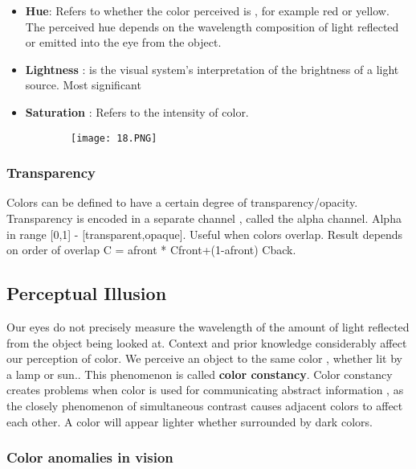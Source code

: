 \documentclass{article}
\begin{document}
\begin{itemize}
    \item \textbf{Hue}: Refers to whether the color perceived is , for example red or yellow. The perceived hue depends on the wavelength composition of light reflected or emitted into the eye from the object.
    \item \textbf{Lightness} : is the visual system's interpretation  of the brightness of a light source. Most significant
    \item \textbf{Saturation} : Refers to the intensity of color. 
\end{itemize}

\begin{figure}[ht!]
  \centering
  \begin{subfigure}[b]{0.3\linewidth}
    \texttt{[image: 18.PNG]}
  \end{subfigure}
\end{figure}

\subsubsection{Transparency}

Colors can be defined to have a certain degree of transparency/opacity.
Transparency is encoded in a separate channel , called the alpha channel. Alpha in range [0,1] - [transparent,opaque].
Useful when colors overlap. Result depends on order of overlap C = afront * Cfront+(1-afront) Cback.

\subsection{Perceptual Illusion}

Our eyes do not precisely measure the wavelength of the amount of light reflected from the object being looked at. Context and prior knowledge considerably affect our perception of color.
We perceive an object to the same color , whether lit by a lamp or sun..
This phenomenon is called \textbf{color constancy}.
Color constancy creates problems when color is used for communicating abstract information , as the closely phenomenon of simultaneous contrast causes adjacent colors to affect each other. A color will appear lighter whether surrounded by dark colors.

\subsubsection{Color anomalies in vision}
\end{document}
